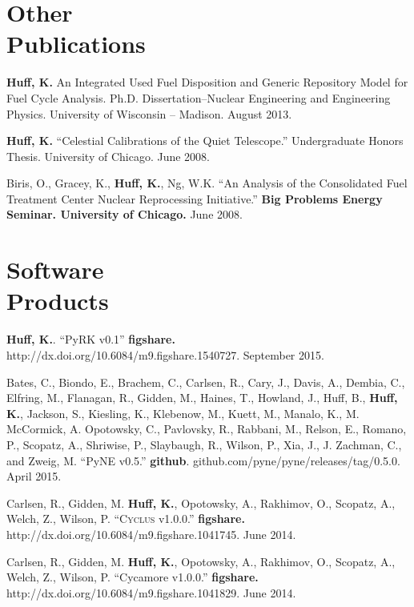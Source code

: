 \documentclass[margin,line]{resume}
\newcommand{\Cyclus}{\textsc{Cyclus}\xspace}%
\begin{document}
\begin{resume}
    \section{\mysidestyle Other\\Publications}
    \begin{bibenum}
      \item \textbf{Huff, K.} An Integrated Used Fuel Disposition and Generic Repository Model for Fuel Cycle Analysis.
        Ph.D. Dissertation--Nuclear Engineering and Engineering
        Physics. University of Wisconsin -- Madison.  August 2013.
      \item \textbf{Huff, K.} ``Celestial Calibrations of the Quiet Telescope.''
        Undergraduate Honors Thesis. University of Chicago. June 2008.
      \item Biris, O., Gracey, K., \textbf{Huff, K.}, Ng, W.K.
        ``An Analysis of the Consolidated Fuel Treatment Center Nuclear
        Reprocessing Initiative.''
        \textbf{Big Problems Energy Seminar. University of Chicago.} June 2008.
    \end{bibenum}
    \section{\mysidestyle Software\\Products}
    \begin{bibenum}
      \item \textbf{Huff, K.}. ``PyRK v0.1'' \textbf{figshare.} http://dx.doi.org/10.6084/m9.figshare.1540727. September 2015.
      \item Bates, C., Biondo, E., Brachem, C., Carlsen, R., Cary, J., Davis, A., Dembia, C., Elfring, M., Flanagan, R., Gidden, M., Haines, T., Howland, J., Huff, B., \textbf{Huff, K.}, Jackson, S., Kiesling, K., Klebenow, M., Kuett, M., Manalo, K., M. McCormick, A. Opotowsky, C., Pavlovsky, R., Rabbani, M., Relson, E., Romano, P., Scopatz, A., Shriwise, P., Slaybaugh, R., Wilson, P., Xia, J., J. Zachman, C., and Zweig, M. ``PyNE v0.5.'' \textbf{github}.  github.com/pyne/pyne/releases/tag/0.5.0. April 2015. 
      \item Carlsen, R., Gidden, M. \textbf{Huff, K.}, Opotowsky, A., Rakhimov, O., Scopatz, A., Welch, Z., Wilson, P. ``\Cyclus v1.0.0.'' \textbf{figshare.} http://dx.doi.org/10.6084/m9.figshare.1041745. June 2014.
      \item Carlsen, R., Gidden, M. \textbf{Huff, K.}, Opotowsky, A., Rakhimov, O., Scopatz, A., Welch, Z., Wilson, P. ``Cycamore v1.0.0.'' \textbf{figshare.} http://dx.doi.org/10.6084/m9.figshare.1041829. June 2014.
 \end{bibenum}

\end{resume}
\end{document}
